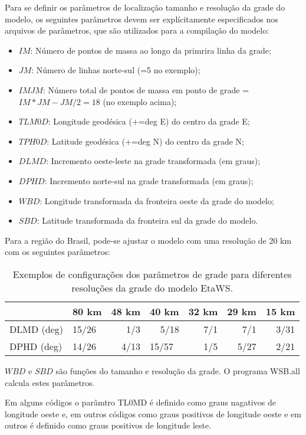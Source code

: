 Para se definir os parâmetros de localização tamanho e resolução da grade do modelo, os seguintes parâmetros devem ser explícitamente especificados nos arquivos de parâmetros, que são utilizados para a compilação do modelo:

\begin{itemize}
\item $IM$: Número de pontos de massa ao longo da primrira linha da grade;
\item $JM$: Número de linhas norte-sul (=5 no exemplo);
\item $IMJM$: Número total de pontos de massa em ponto de grade = $IM*JM-JM/2=18$ (no exemplo acima);
\item $TLM0D$: Longitude geodésica (+=deg E) do centro da grade E;
\item $TPH0D$: Latitude geodésica (+=deg N) do centro da grade N;
\item $DLMD$: Incremento oeste-leste na grade transformada (em graus);
\item $DPHD$: Incremento norte-sul na grade transformada (em graus);
\item $WBD$: Longitude transformada da fronteira oeste da grade do modelo;
\item $SBD$: Latitude transformada da fronteira sul da grade do modelo.
\end{itemize}

Para a região do Brasil, pode-se ajustar o modelo com uma resolução de 20 km com os seguintes parâmetros:

\begin{table}[htbp]
\caption{Exemplos de configurações dos parâmetros de grade para \-di\-fe\-ren\-tes resoluções da grade do modelo EtaWS.}
\begin{tabular}{l|l|r|l|r|r|r}
\hline
 & 80 km & \multicolumn{1}{l|}{48 km} & 40 km & \multicolumn{1}{l|}{32 km} & \multicolumn{1}{l|}{29 km} & \multicolumn{1}{l}{15 km} \\ \hline
DLMD (deg) & 15/26 & 1/3 & \multicolumn{1}{r|}{5/18} & 7/1 & 7/1 & 3/31 \\ \hline
DPHD (deg) & 14/26 & 4/13 & 15/57 & 1/5 & 5/27 & 2/21 \\ \hline
\end{tabular}
\label{tabB01}
\end{table}

$WBD$ e $SBD$ são funções do tamanho e resolução da grade. O programa WSB.all calcula estes parâmetros.

Em alguns códigos o parâmtro TL0MD é definido como graus nagativos de longitude oeste e, em outros códigos como graus positivos de longitude oeste e em outros é definido como graus positivos de longitude leste.


